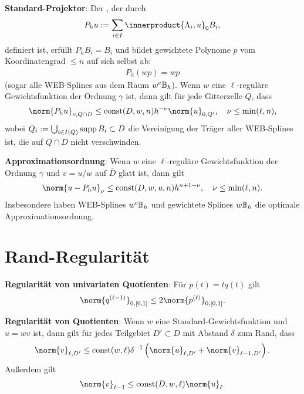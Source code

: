 \textbf{Standard-Projektor}:
Der , der durch
\begin{align*}
    P_h u := \sum_{i \in I} \innerproduct{\Lambda_i, u}_0 B_i,
\end{align*}
definiert ist,
erfüllt $P_h B_i = B_i$ und bildet gewichtete Polynome $p$ vom Koordinatengrad $\le n$
auf sich selbst ab:
\begin{align*}
    P_h (wp) = wp
\end{align*}
(sogar alle WEB-Splines aus dem Raum $w^{\mathrm{e}}\mathbb{B}_h$).
Wenn $w$ eine $\ell$-reguläre Gewichtsfunktion der Ordnung $\gamma$ ist, dann gilt für jede
Gitterzelle $Q$, dass
\begin{align*}
    \norm{P_h u}_{\nu,Q \cap D} \le \const(D, w, n) h^{-\nu} \norm{u}_{0,Q'},\quad
    \nu \le \min(\ell, n),
\end{align*}
wobei $Q_i := \bigcup_{i \in I(Q)} \operatorname{supp} B_i \subset D$ die Vereinigung der Träger
aller WEB-Splines ist, die auf $Q \cap D$ nicht verschwinden.

\textbf{Approximationsordnung}:
Wenn $w$ eine $\ell$-reguläre Gewichtsfunktion der Ordnung $\gamma$ und
$v = u/w$ auf $\overline{D}$ glatt ist,
dann gilt
\begin{align*}
    \norm{u - P_h u}_\nu \le \const(D, w, u, n) h^{n+1-\nu},\quad
    \nu \le \min(\ell, n).
\end{align*}
Insbesondere haben WEB-Splines $w^{\mathrm{e}}\mathbb{B}_h$ und gewichtete Splines $w\mathbb{B}_h$
die optimale Approximationsordnung.

\pagebreak

\section{%
    Rand-Regularität%
}

\textbf{Regularität von univariaten Quotienten}:
Für $p(t) = tq(t)$ gilt
\begin{align*}
    \norm{q^{(\ell-1)}}_{0,[0,1]}
    \le 2 \norm{p^{(\ell)}}_{0,[0,1]}.
\end{align*}

\textbf{Regularität von Quotienten}:
Wenn $w$ eine Standard-Gewichtsfunktion und $u = wv$ ist, dann
gilt für jedes Teilgebiet $D' \subset D$ mit Abstand $\delta$ zum Rand, dass
\begin{align*}
    \norm{v}_{\ell,D'}
    \le \const(w, \ell) \delta^{-1} \left(\norm{u}_{\ell,D'} + \norm{v}_{\ell-1,D'}\right).
\end{align*}
Außerdem gilt
\begin{align*}
    \norm{v}_{\ell-1} \le \const(D, w, \ell) \norm{u}_\ell.
\end{align*}

